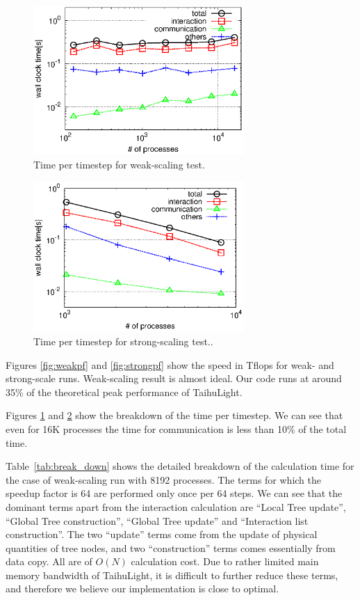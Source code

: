\documentclass[oribibl]{llncs}
\begin{document}
\begin{figure}
  \begin{center}
    \includegraphics[width=8cm,clip]{./fig/weak.eps}
  \end{center}
  \caption{Time per timestep for weak-scaling test. }
  \label{fig:weak}
\end{figure}

\begin{figure}
  \begin{center}
    \includegraphics[width=8cm,clip]{./fig/strong.eps}
  \end{center}
  \caption{Time per timestep for strong-scaling test..}
  \label{fig:strong}
\end{figure}

Figures \ref{fig:weakpf} and \ref{fig:strongpf} show the speed in
Tflops for weak- and strong-scale runs.  Weak-scaling result is almost
ideal. Our code runs at around 35\% of the theoretical peak
performance of TaihuLight.


Figures \ref{fig:weak} and \ref{fig:strong} show the breakdown of the
time per timestep. We can see that even for 16K processes the time for
communication is less than 10\% of the total time.


Table~\ref{tab:break_down} shows the detailed breakdown of the
calculation time for the case of weak-scaling run with 8192 processes.
The terms for which the speedup factor is 64 are performed only once
per 64 steps. We can see that the dominant terms apart from the
interaction calculation are ``Local Tree update'', ``Global Tree
construction'', ``Global Tree update'' and ``Interaction list
construction''.  The two ``update'' terms come from the update of
physical quantities of tree nodes, and two ``construction'' terms
comes essentially from data copy. All are of $O(N)$ calculation cost.
Due to rather limited main memory bandwidth of TaihuLight, it is
difficult to further reduce these terms, and therefore we believe our
implementation is close to optimal.
\end{document}
